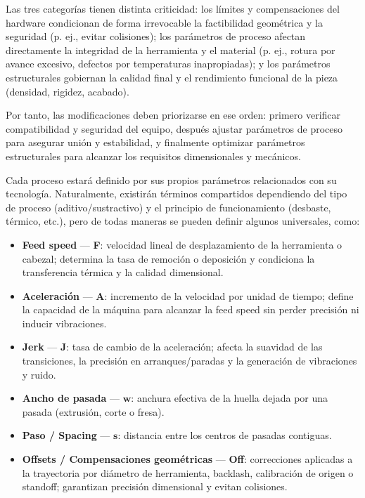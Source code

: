Las tres categorías tienen distinta criticidad: los límites y compensaciones del hardware condicionan de forma irrevocable la factibilidad geométrica y la seguridad (p. ej., evitar colisiones); los parámetros de proceso afectan directamente la integridad de la herramienta y el material (p. ej., rotura por avance excesivo, defectos por temperaturas inapropiadas); y los parámetros estructurales gobiernan la calidad final y el rendimiento funcional de la pieza (densidad, rigidez, acabado). 

Por tanto, las modificaciones deben priorizarse en ese orden: primero verificar compatibilidad y seguridad del equipo, después ajustar parámetros de proceso para asegurar unión y estabilidad, y finalmente optimizar parámetros estructurales para alcanzar los requisitos dimensionales y mecánicos.

Cada proceso estará definido por sus propios parámetros relacionados con su tecnología. Naturalmente, existirán términos compartidos dependiendo del tipo de proceso (aditivo/sustractivo) y el principio de funcionamiento (desbaste, térmico, etc.), pero de todas maneras se pueden definir algunos universales, como:

\begin{itemize}
	\item \textbf{Feed speed} --- \textbf{F}: velocidad lineal de desplazamiento de la herramienta o cabezal; determina la tasa de remoción o deposición y condiciona la transferencia térmica y la calidad dimensional.
	\item \textbf{Aceleración} --- \textbf{A}: incremento de la velocidad por unidad de tiempo; define la capacidad de la máquina para alcanzar la feed speed sin perder precisión ni inducir vibraciones.
	\item \textbf{Jerk} --- \textbf{J}: tasa de cambio de la aceleración; afecta la suavidad de las transiciones, la precisión en arranques/paradas y la generación de vibraciones y ruido.
	\item \textbf{Ancho de pasada} --- \(\mathbf{w}\): anchura efectiva de la huella dejada por una pasada (extrusión, corte o fresa).
	\item \textbf{Paso / Spacing} --- \(\mathbf{s}\): distancia entre los centros de pasadas contiguas.
	\item \textbf{Offsets / Compensaciones geométricas} --- \textbf{Off}: correcciones aplicadas a la trayectoria por diámetro de herramienta, backlash, calibración de origen o standoff; garantizan precisión dimensional y evitan colisiones.
\end{itemize}

